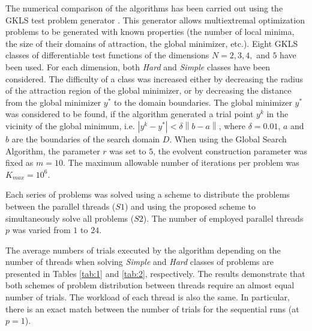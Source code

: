 \documentclass[smallcondensed]{svjour3}     %
\begin{document}
The numerical comparison of the algorithms has been carried out using the GKLS test problem generator \cite{Gaviano2003}. This generator allows multiextremal optimization problems to be generated with known properties (the number of local minima, the size of their domains of attraction, the global minimizer, etc.). Eight GKLS classes of differentiable test functions of the dimensions $N = 2,3,4,$ and $5$ have been used. For each dimension, both \textit{Hard} and \textit{Simple} classes have been considered. The difficulty of a class was increased either by decreasing the radius of the attraction region of the global minimizer, or by decreasing the distance from the global minimizer $y^\ast$ to the domain boundaries. The global minimizer $y^\ast$ was considered to be found, if the algorithm generated a trial point $y^k$ in the vicinity of the global minimum, i.e. $\left|y^k-y^\ast\right| < \delta \left\|b-a\right\|$, where $\delta = 0.01$, $a$ and $b$ are the boundaries of the search domain $D$. When using the Global Search Algorithm, the parameter $r$ was set to $5$, the evolvent construction parameter was fixed as $m = 10$. The maximum allowable number of iterations per problem was $K_{max} = 10^6$.

Each series of problems was solved using a scheme to distribute the problems between the parallel threads ($S1$) and using the proposed scheme to simultaneously solve all problems ($S2$). The number of employed parallel threads $p$ was varied from $1$ to $24$.

The average numbers of trials executed by the algorithm depending on the number of threads when solving \textit{Simple} and \textit{Hard} classes of problems are presented in Tables \ref{tab:1} and \ref{tab:2}, respectively. The results demonstrate that both schemes of problem distribution between threads require an almost equal number of trials. The workload of each thread is also the same. In particular, there is an exact match between the number of trials for the sequential runs (at $p = 1$).  
\end{document}
